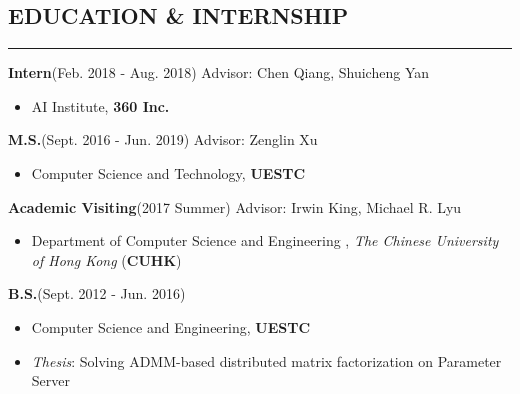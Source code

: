 \documentclass{res}
\begin{document}

\address{Master Student \\School of Computer Science and Engineering \\University of Electronic Science and Technology of China \textbf{(UESTC)}}

\address{Email: jinmian.y@gmail.com \\
         Phone: (86) 177 0811 2046 \\ Github: https://github.com/ay27}

\begin{resume}


\section{EDUCATION \& INTERNSHIP}
\vspace{-1ex}
\noindent\rule[0.1\baselineskip]{\textwidth}{1pt}
\textbf{Intern}\quad (Feb. 2018 - Aug. 2018)  \hfill Advisor: Chen Qiang, Shuicheng Yan
\begin{itemize}\setlength{\itemsep}{-0.5ex}
\item AI Institute, \textbf{360 Inc.}
\end{itemize}
\vspace{-2ex}
\textbf{M.S.}\quad (Sept. 2016 - Jun. 2019) \hspace{178pt} Advisor: Zenglin Xu
\begin{itemize}\setlength{\itemsep}{-0.5ex}
\item Computer Science and Technology, \textbf{UESTC}
\end{itemize}
\vspace{-2ex}
\textbf{Academic Visiting}\quad (2017 Summer) \hspace{144pt} Advisor: Irwin King, Michael R. Lyu
\begin{itemize}\setlength{\itemsep}{-0.5ex}
\item Department of Computer Science and Engineering , \textit{The Chinese University of Hong Kong} (\textbf{CUHK})
\end{itemize}
\vspace{-2ex}
\textbf{B.S.}\quad (Sept. 2012 - Jun. 2016)
\begin{itemize}\setlength{\itemsep}{-0.5ex}
\item Computer Science and Engineering, \textbf{UESTC}
\item \textit{Thesis}: Solving ADMM-based distributed matrix factorization on Parameter Server
\end{itemize}



\end{resume}
\end{document}
